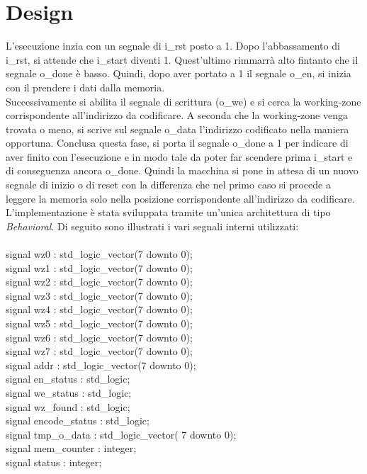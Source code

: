 \documentclass{article}
\begin{document}
\section{Design}
L'esecuzione inzia con un segnale di {\selectfont i\_rst} posto a 1. Dopo l'abbassamento di {\selectfont i\_rst}, si attende che {\selectfont i\_start} diventi 1. Quest'ultimo rimmarrà alto fintanto che il segnale {\selectfont o\_done} è basso. Quindi, dopo aver portato a 1 il segnale {\selectfont o\_en}, si inizia con il prendere i dati dalla memoria.\\Successivamente si abilita il segnale di scrittura ({\selectfont o\_we}) e si cerca la working-zone corrispondente all'indirizzo da codificare. A seconda che la working-zone venga trovata o meno, si scrive sul segnale {\selectfont o\_data} l'indirizzo codificato nella maniera opportuna. Conclusa questa fase, si porta il segnale {\selectfont o\_done} a 1 per indicare di aver finito con l'esecuzione e in modo tale da poter far scendere prima {\selectfont i\_start} e di conseguenza ancora {\selectfont o\_done}. Quindi la macchina si pone in attesa di un nuovo segnale di inizio o di reset con la differenza che nel primo caso si procede a leggere la memoria solo nella posizione corrispondente all'indirizzo da codificare.\\
L'implementazione è stata sviluppata tramite un'unica architettura di tipo \textit{Behavioral}. Di seguito sono illustrati i vari segnali interni utilizzati:\\\\
{\selectfont
signal wz0 : std\_logic\_vector(7 downto 0);\\
signal wz1 : std\_logic\_vector(7 downto 0);\\
signal wz2 : std\_logic\_vector(7 downto 0);\\
signal wz3 : std\_logic\_vector(7 downto 0);\\
signal wz4 : std\_logic\_vector(7 downto 0);\\
signal wz5 : std\_logic\_vector(7 downto 0);\\
signal wz6 : std\_logic\_vector(7 downto 0);\\
signal wz7 : std\_logic\_vector(7 downto 0);\\
signal addr : std\_logic\_vector(7 downto 0);\\
signal en\_status : std\_logic;\\
signal we\_status : std\_logic;\\
signal wz\_found : std\_logic;\\
signal encode\_status : std\_logic;\\
signal tmp\_o\_data : std\_logic\_vector( 7 downto 0);\\
signal mem\_counter : integer;\\
signal status : integer;\\
}
\end{document}
